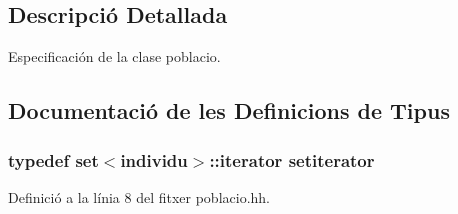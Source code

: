 \subsection{Descripció Detallada}
Especificación de la clase poblacio. 



\subsection{Documentació de les Definicions de Tipus}
\subsubsection[{\texorpdfstring{setiterator}{setiterator}}]{\setlength{\rightskip}{0pt plus 5cm}typedef set$<${\bf individu}$>$\+::iterator {\bf setiterator}}\hypertarget{poblacio_8hh_a54fb6ab8ec9e9336d208b860dca1513d}{}\label{poblacio_8hh_a54fb6ab8ec9e9336d208b860dca1513d}


Definició a la línia 8 del fitxer poblacio.\+hh.

